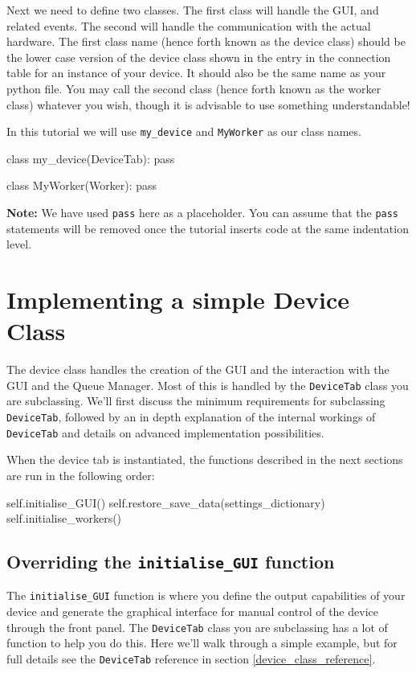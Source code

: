 \documentclass[12pt]{article}
\begin{document}
Next we need to define two classes. 
The first class will handle the GUI, and related events. 
The second will handle the communication with the actual hardware. 
The first class name (hence forth known as the device class) should be the lower case version of the device class shown in the entry in the connection table for an instance of your device. 
It should also be the same name as your python file. 
You may call the second class (hence forth known as the worker class) whatever you wish, though it is advisable to use something understandable!

In this tutorial we will use \texttt{my\_device} and \texttt{MyWorker} as our class names. 

\begin{python}
class my_device(DeviceTab):
    pass
	
class MyWorker(Worker):
    pass
\end{python}

\textbf{Note:} We have used \texttt{pass} here as a placeholder. 
You can assume that the \texttt{pass} statements will be removed once the tutorial inserts code at the same indentation level.


\section{Implementing a simple Device Class}\label{device_class}
The device class handles the creation of the GUI and the interaction with the GUI and the Queue Manager. 
Most of this is handled by the \texttt{DeviceTab} class you are subclassing.
We'll first discuss the minimum requirements for subclassing \texttt{DeviceTab}, followed by an in depth explanation of the internal workings of \texttt{DeviceTab} and details on advanced implementation possibilities.

When the device tab is instantiated, the functions described in the next sections are run in the following order:
\begin{python}
    self.initialise_GUI() 
    self.restore_save_data(settings_dictionary)
    self.initialise_workers()
\end{python}

\subsection{Overriding the \texttt{initialise\_GUI} function}\label{tutorial:overriding_initialise_GUI}
The \texttt{initialise\_GUI} function is where you define the output capabilities of your device and generate the graphical interface for manual control of the device through the front panel.
The \texttt{DeviceTab} class you are subclassing has a lot of function to help you do this.
Here we'll walk through a simple example, but for full details see the \texttt{DeviceTab} reference in section \ref{device_class_reference}.
\end{document}
